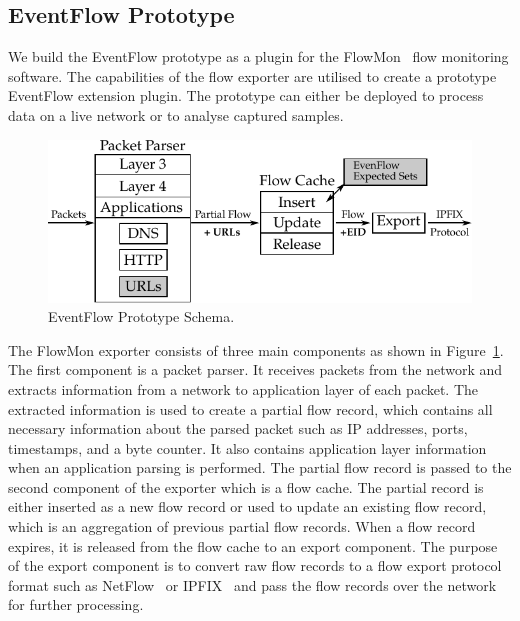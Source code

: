 \subsection{EventFlow Prototype} \label{subsec:eventflow-prototype}

We build the EventFlow prototype as a plugin for the FlowMon~\cite{FlowmonNetworks--Flowmon} flow monitoring software. The capabilities of the flow exporter are utilised to create a prototype EventFlow extension plugin. The prototype can either be deployed to process data on a live network or to analyse captured samples.

\begin{figure}[!tb]
    \centering 
    \includegraphics{figures/paper-eventflow/prototype-schema}
    \caption{EventFlow Prototype Schema.}
    \label{fig:eventflow-prototype-schema}
\end{figure}


The FlowMon exporter consists of three main components as shown in Figure~\ref{fig:eventflow-prototype-schema}. The first component is a packet parser. It receives packets from the network and extracts information from a network to application layer of each packet. The extracted information is used to create a partial flow record, which contains all necessary information about the parsed packet such as IP addresses, ports, timestamps, and a byte counter. It also contains application layer information when an application parsing is performed. The partial flow record is passed to the second component of the exporter which is a flow cache. The partial record is either inserted as a new flow record or used to update an existing flow record, which is an aggregation of previous partial flow records. When a flow record expires, it is released from the flow cache to an export component. The purpose of the export component is to convert raw flow records to a flow export protocol format such as NetFlow~\cite{rfc3954} or IPFIX~\cite{rfc7011} and pass the flow records over the network for further processing.

